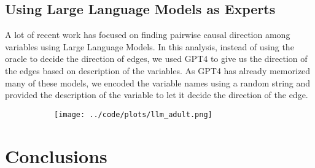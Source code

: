 \documentclass[letterpaper]{article} %
\begin{document}
\subsection{Using Large Language Models as Experts}
A lot of recent work has focused on finding pairwise causal direction among
variables using Large Language Models. In this analysis, instead of using the
oracle to decide the direction of edges, we used GPT4 to give us the direction
of the edges based on description of the variables. As GPT4 has already
memorized many of these models, we encoded the variable names using a random
string and provided the description of the variable to let it decide the
direction of the edge.

\begin{figure}
	\centering
	\begin{subfigure}{0.5\textwidth}
		\caption{}
	\end{subfigure}
	\begin{subfigure}{0.5\textwidth}
		\centering
		\texttt{[image: ../code/plots/llm\_adult.png]}
		\caption{}
	\end{subfigure}
\end{figure}

\section{Conclusions}

\newpage

\end{document}
